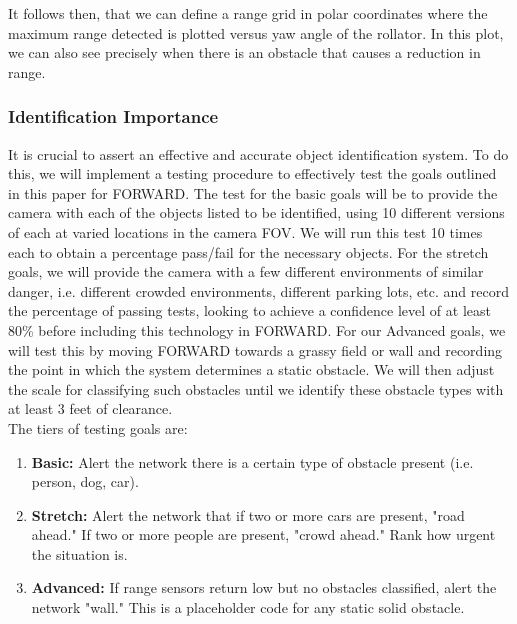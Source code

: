 
\noindent It follows then, that we can define a range grid in polar coordinates where the maximum range detected is plotted versus yaw angle of the rollator. In this plot, we can also see precisely when there is an obstacle that causes a reduction in range.\\

\subsubsection{Identification Importance}
\noindent It is crucial to assert an effective and accurate object identification system. To do this, we will implement a testing procedure to effectively test the goals outlined in this paper for FORWARD. The test for the basic goals will be to provide the camera with each of the objects listed to be identified, using 10 different versions of each at varied locations in the camera FOV. We will run this test 10 times each to obtain a percentage pass/fail for the necessary objects. For the stretch goals, we will provide the camera with a few different environments of similar danger, i.e. different crowded environments, different parking lots, etc. and record the percentage of passing tests, looking to achieve a confidence level of at least 80\% before including this technology in FORWARD. For our Advanced goals, we will test this by moving FORWARD towards a grassy field or wall and recording the point in which the system determines a static obstacle. We will then adjust the scale for classifying such obstacles until we identify these obstacle types with at least 3 feet of clearance. \\

The tiers of testing goals are:
\begin{enumerate}
	\item \textbf{Basic:} Alert the network there is a certain type of obstacle present (i.e. person, dog, car).
	\item \textbf{Stretch:} Alert the network that if two or more cars are present, "road ahead." If two or more people are present, "crowd ahead." Rank how urgent the situation is.
	\item \textbf{Advanced:} If range sensors return low but no obstacles classified, alert the network "wall." This is a placeholder code for any static solid obstacle.
\end{enumerate}

